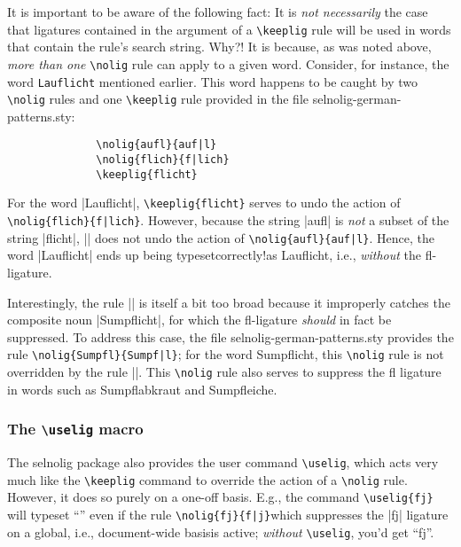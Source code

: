 \documentclass[11pt]{article}
\newcommand{\pkg}[1]{\textsf{#1}}
\newcommand{\opt}[1]{\texttt{#1}}
\newcommand{\cmmd}[1]{\texttt{\textbackslash #1}}
\begin{document}

It is important to be aware of the following fact: It is \emph{not necessarily} the case that ligatures contained in the argument of a \cmmd{keeplig} rule will be used in words that contain the rule's search string. Why?! It is because, as was noted above, \emph{more than one} \cmmd{nolig} rule can apply to a given word. Consider, for instance, the word \opt{Lauflicht} mentioned earlier. This word happens to be caught by two \cmmd{nolig} rules and one \cmmd{keeplig} rule provided in the file \pkg{selnolig-german-patterns.sty}:
\begin{Verbatim}
              \nolig{aufl}{auf|l}
              \nolig{flich}{f|lich}
              \keeplig{flicht}
\end{Verbatim}
For the word |Lauflicht|, \Verb+\keeplig{flicht}+ serves to undo the action of \Verb+\nolig{flich}{f|lich}+. However, because the string |aufl| is \emph{not} a subset of the string |flicht|, || does not undo the action of \Verb+\nolig{aufl}{auf|l}+. Hence, the word |Lauflicht| ends up being typeset\textemdash correctly!\textemdash as Lauflicht, i.e., \emph{without} the fl-ligature. 

Interestingly, the rule || is itself a bit too broad because it improperly catches the composite noun |Sumpflicht|, for which the fl-ligature \emph{should} in fact be suppressed.%
To address this case, the file \pkg{selnolig-german-patterns.sty} provides the rule \Verb+\nolig{Sumpfl}{Sumpf|l}+; for the word Sumpflicht, this \cmmd{nolig} rule is not overridden by the rule ||. This \cmmd{nolig} rule also serves to suppress the fl ligature in words such as Sumpflabkraut and Sumpfleiche.


\subsubsection{The \cmmd{uselig} macro} 
\label{sec:uselig}

The \pkg{selnolig} package also provides the user command \cmmd{uselig}, which acts very much like the \cmmd{keeplig} command to override the action of a \cmmd{nolig} rule. However, it does so purely on a one-off basis. E.g., the command \Verb+\uselig{fj}+ will typeset \enquote{} even if the rule \Verb+\nolig{fj}{f|j}+\textemdash which suppresses the |fj| ligature on a global, i.e., document-wide basis\textemdash is active; \emph{without} \cmmd{uselig}, you'd get \enquote{fj}.
\end{document}

